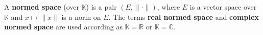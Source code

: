 A \textbf{normed space} (over $\mathbb{K}$) is a pair $(E, \|\cdot\|)$, where $E$ is a vector space over $\mathbb{K}$ and $x \mapsto \|x\|$ is a norm on $E$. The terms \textbf{real normed space} and \textbf{complex normed space} are used according as $\mathbb{K} = \mathbb{R}$ or $\mathbb{K} = \mathbb{C}$.
